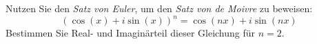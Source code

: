 \begin{ExerciseBlock}
Nutzen Sie den \emph{Satz von Euler}, um den \emph{Satz von de Moivre} zu beweisen:
\begin{equation*}
	\left( \cos(x)+i \sin(x) \right)^n = \cos(nx)+i \sin(nx)
\end{equation*}
Bestimmen Sie Real- und Imaginärteil dieser Gleichung für $n=2$.

\end{ExerciseBlock}
